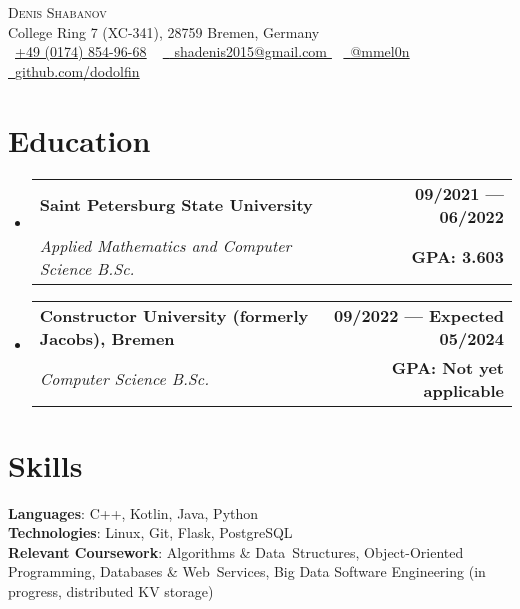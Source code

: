 \documentclass[a4,12pt]{article}
\makeatletter
\newcommand{\resumeSubheading}[4]{
  \vspace{-2pt}\item
    \begin{tabular*}{1.0\textwidth}[t]{l@{\extracolsep{\fill}}r}
      \textbf{#1} & \textbf{\small #2} \\
      \textit{\small#3} & \textbf{\small #4} \\
    \end{tabular*}\vspace{-7pt}
}
\newcommand{\resumeSubHeadingListStart}{\begin{itemize}[leftmargin=0.0in, label={}]}
\newcommand{\resumeSubHeadingListEnd}{\end{itemize}}
\makeatother
\begin{document}

\begin{center}
    {\Huge \scshape Denis Shabanov} \\ \vspace{1pt}
    College Ring 7 (XC-341), 28759 Bremen, Germany \\ \vspace{1pt}
    \small \raisebox{-0.1\height}\faPhone\
    \href{tel:+4901748549668}{\underline{+49 (0174) 854-96-68}} ~
    \href{
    mailto:shadenis2015@gmail.com
    }{\raisebox{-0.2\height}\faEnvelope\  \underline{
    shadenis2015@gmail.com
    }} ~ 
    \href{https://t.me/mmel0n}{\raisebox{-0.2\height}\faSend\ \underline{@mmel0n}}  ~
    \href{https://github.com/dodolfin}{\raisebox{-0.2\height}\faGithub\ \underline{github.com/dodolfin}}
    \vspace{-8pt}
\end{center}


\section{Education}
  \resumeSubHeadingListStart
    \resumeSubheading
      {Saint Petersburg State University}{09/2021 — 06/2022}
      {Applied Mathematics and Computer Science B.Sc.}{GPA: 3.603}
    \resumeSubheading
      {Constructor University (formerly Jacobs), Bremen}{09/2022 — Expected 05/2024}
      {Computer Science B.Sc.}{\textbf{GPA: Not yet applicable}}
  \resumeSubHeadingListEnd
  

\section{Skills}
 \begin{itemize}[leftmargin=0.15in, label={}]
    \small{\item{
     \textbf{Languages}{: C++, Kotlin, Java, Python} \\
     \textbf{Technologies}{: Linux, Git, Flask, PostgreSQL} \\
     \textbf{Relevant Coursework}{: Algorithms \& Data~Structures, Object-Oriented Programming, Databases \& Web~Services, Big Data Software Engineering (in progress, distributed KV storage)}
    }}
 \end{itemize}
 \vspace{-16pt}
\end{document}
